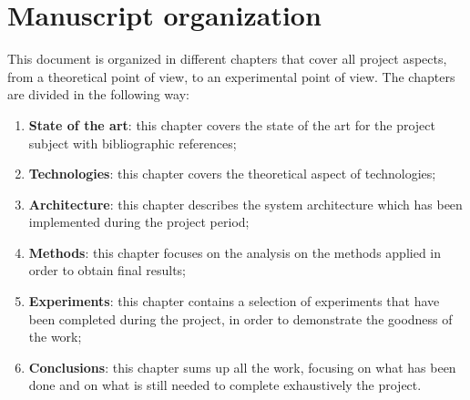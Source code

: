 \documentclass[\main/main.tex]{subfiles}
\begin{document}
\section*{Manuscript organization}
This document is organized in different chapters that cover all project aspects, from a theoretical point of view, to an experimental point of view.
The chapters are divided in the following way:
\begin{enumerate}
    \item \textbf{State of the art}: this chapter covers the state of the art for the project subject with bibliographic references;
    \item \textbf{Technologies}: this chapter covers the theoretical aspect of technologies;
    \item \textbf{Architecture}: this chapter describes the system architecture which has been implemented during the project period;
    \item \textbf{Methods}: this chapter focuses on the analysis on the methods applied in order to obtain final results;
    \item \textbf{Experiments}: this chapter contains a selection of experiments that have been completed during the project, in order to demonstrate the goodness of the work;
    \item \textbf{Conclusions}: this chapter sums up all the work, focusing on what has been done and on what is still needed to complete exhaustively the project.
\end{enumerate}
\end{document}
